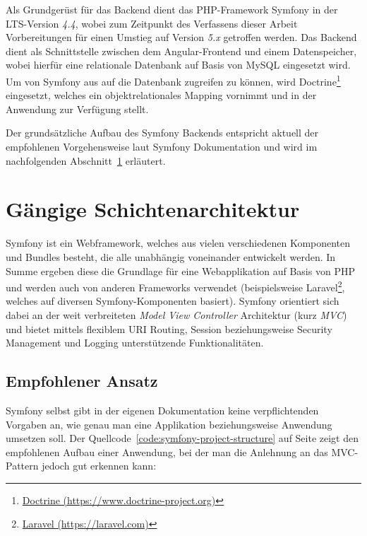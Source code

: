 \documentclass[a4paper,12pt,twoside]{scrreprt}
\begin{document}
Als Grundgerüst für das Backend dient das PHP-Framework Symfony in der LTS-Version \textit{4.4}, wobei zum Zeitpunkt des Verfassens dieser Arbeit Vorbereitungen für einen Umstieg auf Version \textit{5.x} getroffen werden. Das Backend dient als Schnittstelle zwischen dem Angular-Frontend und einem Datenspeicher, wobei hierfür eine relationale Datenbank auf Basis von MySQL eingesetzt wird. Um von Symfony aus auf die Datenbank zugreifen zu können, wird Doctrine\footnote{\href{https://www.doctrine-project.org}{Doctrine (https://www.doctrine-project.org)}} eingesetzt, welches ein objektrelationales Mapping vornimmt und in der Anwendung zur Verfügung stellt.

Der grundsätzliche Aufbau des Symfony Backends entspricht aktuell der empfohlenen Vorgehensweise laut Symfony Dokumentation und wird im nachfolgenden Abschnitt~\ref{sec:standard-schichtenarchitektur} erläutert.

\section{Gängige Schichtenarchitektur}
\label{sec:standard-schichtenarchitektur}

Symfony ist ein Webframework, welches aus vielen verschiedenen Komponenten und Bundles besteht, die alle unabhängig voneinander entwickelt werden. In Summe ergeben diese die Grundlage für eine Webapplikation auf Basis von PHP und werden auch von anderen Frameworks verwendet (beispielsweise Laravel\footnote{\href{https://laravel.com}{Laravel (https://laravel.com)}}, welches auf diversen Symfony-Komponenten basiert). Symfony orientiert sich dabei an der weit verbreiteten \textit{Model View Controller} Architektur (kurz \textit{MVC}) und bietet mittels flexiblem URI Routing, Session beziehungsweise Security Management und Logging unterstützende Funktionalitäten. \parencite[][]{tutorials_point_i_pvt_ltd_symfony_nodate-1}

\subsection{Empfohlener Ansatz}
\label{sub-sec:empfohlener-ansatz}
Symfony selbst gibt in der eigenen Dokumentation keine verpflichtenden Vorgaben an, wie genau man eine Applikation beziehungsweise Anwendung umsetzen soll. \parencite[][]{symfony_symfony_2020} Der Quellcode~\ref{code:symfony-project-structure} auf Seite \pageref{code:symfony-project-structure} zeigt den empfohlenen Aufbau einer Anwendung, bei der man die Anlehnung an das MVC-Pattern jedoch gut erkennen kann:
\end{document}
